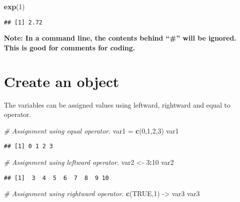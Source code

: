 \documentclass[]{book}
\newenvironment{Shaded}{\begin{snugshade}}{\end{snugshade}}
\newcommand{\KeywordTok}[1]{\textcolor[rgb]{0.13,0.29,0.53}{\textbf{#1}}}
\newcommand{\DecValTok}[1]{\textcolor[rgb]{0.00,0.00,0.81}{#1}}
\newcommand{\StringTok}[1]{\textcolor[rgb]{0.31,0.60,0.02}{#1}}
\newcommand{\CommentTok}[1]{\textcolor[rgb]{0.56,0.35,0.01}{\textit{#1}}}
\newcommand{\OtherTok}[1]{\textcolor[rgb]{0.56,0.35,0.01}{#1}}
\newcommand{\OperatorTok}[1]{\textcolor[rgb]{0.81,0.36,0.00}{\textbf{#1}}}
\newcommand{\NormalTok}[1]{#1}
\theoremstyle{definition}
\theoremstyle{definition}
\theoremstyle{definition}
\theoremstyle{remark}
\begin{document}
\begin{Shaded}
\begin{Highlighting}[]
\KeywordTok{exp}\NormalTok{(}\DecValTok{1}\NormalTok{)}
\end{Highlighting}
\end{Shaded}

\begin{verbatim}
## [1] 2.72
\end{verbatim}

\textbf{Note: In a command line, the contents behind ``\#'' will be
ignored. This is good for comments for coding.}

\section{Create an object}\label{create-an-object}

The variables can be assigned values using leftward, rightward and equal
to operator.

\begin{Shaded}
\begin{Highlighting}[]
\CommentTok{# Assignment using equal operator.}
\NormalTok{var1 =}\StringTok{ }\KeywordTok{c}\NormalTok{(}\DecValTok{0}\NormalTok{,}\DecValTok{1}\NormalTok{,}\DecValTok{2}\NormalTok{,}\DecValTok{3}\NormalTok{) }
\NormalTok{var1}
\end{Highlighting}
\end{Shaded}

\begin{verbatim}
## [1] 0 1 2 3
\end{verbatim}

\begin{Shaded}
\begin{Highlighting}[]
\CommentTok{# Assignment using leftward operator.}
\NormalTok{var2 <-}\StringTok{ }\DecValTok{3}\OperatorTok{:}\DecValTok{10}
\NormalTok{var2}
\end{Highlighting}
\end{Shaded}

\begin{verbatim}
## [1]  3  4  5  6  7  8  9 10
\end{verbatim}

\begin{Shaded}
\begin{Highlighting}[]
\CommentTok{# Assignment using rightward operator.   }
\KeywordTok{c}\NormalTok{(}\OtherTok{TRUE}\NormalTok{,}\DecValTok{1}\NormalTok{) ->}\StringTok{ }\NormalTok{var3  }
\NormalTok{var3}
\end{Highlighting}
\end{Shaded}
\end{document}
